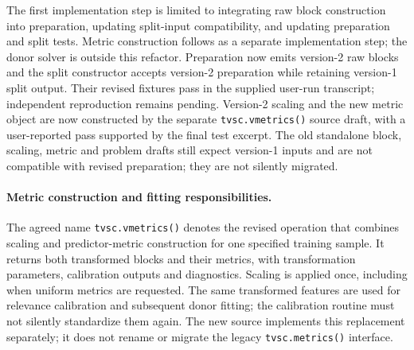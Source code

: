 \documentclass[11pt]{article}
\begin{document}
The first implementation step is limited to integrating raw block
construction into preparation, updating split-input compatibility, and
updating preparation and split tests. Metric construction follows as a
separate implementation step; the donor solver is outside this refactor.
Preparation now emits version-2 raw blocks and the split constructor
accepts version-2 preparation while retaining version-1 split output.
Their revised fixtures pass in the supplied user-run transcript; independent
reproduction remains pending. Version-2 scaling and
the new metric object are now constructed by the separate
\texttt{tvsc.vmetrics()} source draft, with a user-reported pass supported
by the final test excerpt. The old standalone block,
scaling, metric and problem drafts still expect version-1 inputs and are
not compatible with revised preparation; they are not silently migrated.

\paragraph{Metric construction and fitting responsibilities.}
The agreed name \texttt{tvsc.vmetrics()} denotes the revised operation
that combines scaling and predictor-metric construction for one specified
training sample. It returns both transformed blocks and their metrics,
with transformation parameters, calibration outputs and diagnostics.
Scaling is applied once, including when uniform metrics are requested.
The same transformed features are used for relevance calibration and
subsequent donor fitting; the calibration routine must not silently
standardize them again. The new source implements this replacement
separately; it does not rename or migrate the legacy \texttt{tvsc.metrics()}
interface.
\end{document}
